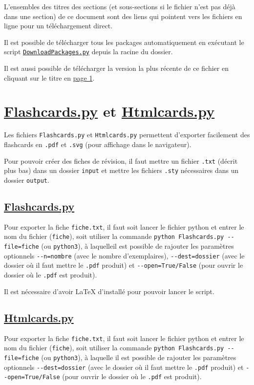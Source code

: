 \documentclass[a4paper,12pt]{article}
\let\oldsection\section
\newcommand{\ssection}[2][]{\clearpage\oldsection[#1]{#2}}
\newcounter{pagenb}
\begin{document}
\vspace{0.5cm}

L'ensembles des titres des sections (et sous-sections si le fichier n'est pas déjà dans une section) de ce document sont des liens qui pointent vers les fichiers en ligne pour un téléchargement direct.

Il est possible de télécharger tous les packages automatiquement en exécutant le script \href{https://rfoxinter.github.io/revisions/DownloadPackages.py}{\texttt{DownloadPackages.py}} depuis la racine du dossier.

Il est aussi possible de télécharger la version la plus récente de ce fichier en cliquant sur le titre en \hyperlink{section*.1}{page 1}.
\setcounter{pagenb}{\thepage}
\newpage
{}
\tableofcontents
\null\newpage
{}
\setcounter{page}{\thepagenb}
\ssection[Flashcards.py et Htmlcards.py]{\href{https://rfoxinter.github.io/revisions/Flashcards.py}{\color{black}Flashcards.py} et \href{https://rfoxinter.github.io/revisions/Htmlcards.py}{\color{black}Htmlcards.py}}
Les fichiers \texttt{Flashcards.py} et \texttt{Htmlcards.py} permettent d'exporter facilement des flashcards en \texttt{.pdf} et \texttt{.svg} (pour affichage dans le navigateur).

Pour pouvoir créer des fiches de révision, il faut mettre un fichier \texttt{.txt} (décrit plus bas) dans un dossier \texttt{input} et mettre les fichiers \texttt{.sty} nécessaires dans un dossier \texttt{output}.
\subsection[Flashcards.py]{\href{https://rfoxinter.github.io/revisions/Flashcards.py}{\color{black}Flashcards.py}}
Pour exporter la fiche \texttt{fiche.txt}, il faut soit lancer le fichier python et entrer le nom du fichier (\texttt{fiche}), soit utiliser la commande \texttt{python Flashcards.py -{}-file=fiche} (ou \texttt{python3}), à laquelleil est possible de rajouter les paramètres optionnels \texttt{-{}-n=nombre} (avec le nombre d'exemplaires), \texttt{-{}-dest=dossier} (avec le dossier où il faut mettre le \texttt{.pdf} produit) et \texttt{-{}-open=True/False} (pour ouvrir le dossier où le \texttt{.pdf} est produit).

Il est nécessaire d'avoir \LaTeX{} d'installé pour pouvoir lancer le script.
\subsection[Htmlcards.py]{\href{https://rfoxinter.github.io/revisions/Htmlcards.py}{\color{black}Htmlcards.py}}
Pour exporter la fiche \texttt{fiche.txt}, il faut soit lancer le fichier python et entrer le nom du fichier (\texttt{fiche}), soit utiliser la commande \texttt{python Flashcards.py -{}-file=fiche} (ou \texttt{python3}), à laquelle il est possible de rajouter les paramètres optionnels \texttt{-{}-dest=dossier} (avec le dossier où il faut mettre le \texttt{.pdf} produit) et \texttt{-{}-open=True/False} (pour ouvrir le dossier où le \texttt{.pdf} est produit).
\end{document}
